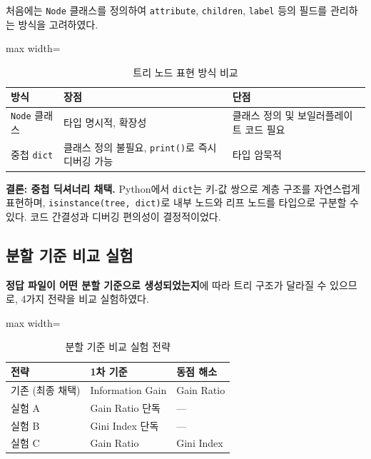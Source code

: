 \documentclass[12pt, a4paper]{article}
\begin{document}
처음에는 \texttt{Node} 클래스를 정의하여 \texttt{attribute}, \texttt{children}, \texttt{label} 등의 필드를 관리하는 방식을 고려하였다.

\begin{table}[h]
\centering
\begin{adjustbox}{max width=\textwidth}
\begin{tabular}{lll}
\toprule
\textbf{방식} & \textbf{장점} & \textbf{단점} \\
\midrule
\texttt{Node} 클래스 & 타입 명시적, 확장성 & 클래스 정의 및 보일러플레이트 코드 필요 \\
중첩 \texttt{dict}   & 클래스 정의 불필요, \texttt{print()}로 즉시 디버깅 가능 & 타입 암묵적 \\
\bottomrule
\end{tabular}
\end{adjustbox}
\caption{트리 노드 표현 방식 비교}
\end{table}

\noindent\textbf{결론: 중첩 딕셔너리 채택.} Python에서 \texttt{dict}는 키-값 쌍으로 계층 구조를 자연스럽게 표현하며, \texttt{isinstance(tree, dict)}로 내부 노드와 리프 노드를 타입으로 구분할 수 있다. 코드 간결성과 디버깅 편의성이 결정적이었다.


\subsection{분할 기준 비교 실험}

\textbf{정답 파일이 어떤 분할 기준으로 생성되었는지}에 따라 트리 구조가 달라질 수 있으므로, 4가지 전략을 비교 실험하였다.

\begin{table}[h]
\centering
\begin{adjustbox}{max width=\textwidth}
\begin{tabular}{lll}
\toprule
\textbf{전략} & \textbf{1차 기준} & \textbf{동점 해소} \\
\midrule
기존 (최종 채택) & Information Gain & Gain Ratio \\
실험 A           & Gain Ratio 단독  & --- \\
실험 B           & Gini Index 단독  & --- \\
실험 C           & Gain Ratio       & Gini Index \\
\bottomrule
\end{tabular}
\end{adjustbox}
\caption{분할 기준 비교 실험 전략}
\end{table}
\end{document}
